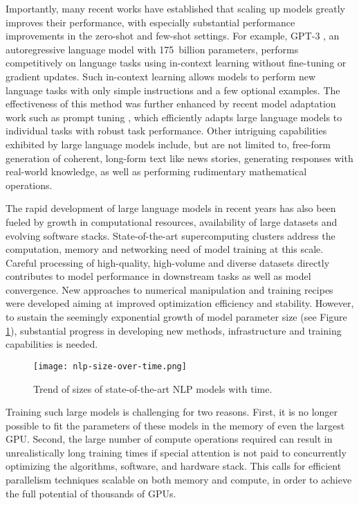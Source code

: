 \documentclass[11pt]{article}
\begin{document}
Importantly, many recent works have established that scaling up models greatly improves their performance, with especially substantial performance improvements in the zero-shot and few-shot settings. For example, GPT-3 \cite{brown2020language}, an autoregressive language model with 175~billion parameters, performs competitively on language tasks using in-context learning without fine-tuning or gradient updates. Such in-context learning allows models to perform new language tasks with only simple instructions and a few optional examples. The effectiveness of this method was further enhanced by recent model adaptation work such as prompt tuning \cite{lester2021power}, which efficiently adapts large language models to individual tasks with robust task performance. Other intriguing capabilities exhibited by large language models include, but are not limited to, free-form generation of coherent, long-form text like news stories, generating responses with real-world knowledge, as well as performing rudimentary mathematical operations.

The rapid development of large language models in recent years has also been fueled by growth in computational resources, availability of large datasets and evolving software stacks. State-of-the-art supercomputing clusters address the computation, memory and networking need of model training at this scale. Careful processing of high-quality, high-volume and diverse datasets directly contributes to model performance in downstream tasks as well as model convergence. New approaches to numerical manipulation and training recipes were developed aiming at improved optimization efficiency and stability. However, to sustain the seemingly exponential growth of model parameter size (see Figure \ref{fig:nlp_trends}), substantial progress in developing new methods, infrastructure and training capabilities is needed.

\begin{figure}
    \centering
    \texttt{[image: nlp-size-over-time.png]}
    \caption{Trend of sizes of state-of-the-art NLP models with time.}
    \label{fig:nlp_trends}
\end{figure}

Training such large models is challenging for two reasons.  First, it is no longer possible to fit the parameters of these models in the memory of even the largest GPU.
Second, the large number of compute operations required can result in unrealistically long training times if special attention is not paid to concurrently optimizing the algorithms, software, and hardware stack. This calls for efficient parallelism techniques scalable on both memory and compute, in order to achieve the full potential of thousands of GPUs.
\end{document}
